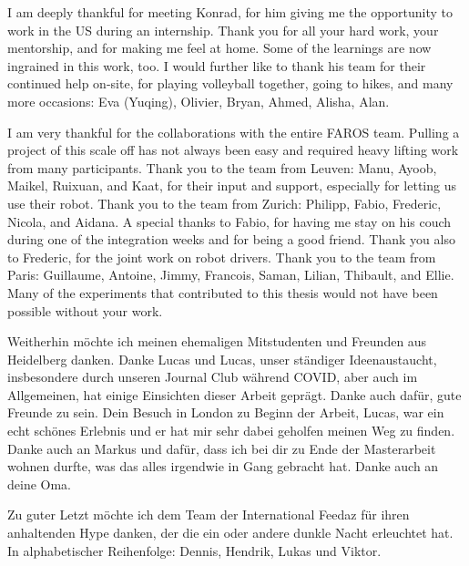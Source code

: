 


I am deeply thankful for meeting Konrad, for him giving me the opportunity to work in the US during an internship. Thank you for all your hard work, your mentorship, and for making me feel at home. Some of the learnings are now ingrained in this work, too. I would further like to thank his team for their continued help on-site, for playing volleyball together, going to hikes, and many more occasions: Eva (Yuqing), Olivier, Bryan, Ahmed, Alisha, Alan.


I am very thankful for the collaborations with the entire FAROS team. Pulling a project of this scale off has not always been easy and required heavy lifting work from many participants. Thank you to the team from Leuven: Manu, Ayoob, Maikel, Ruixuan, and Kaat, for their input and support, especially for letting us use their robot. Thank you to the team from Zurich: Philipp, Fabio, Frederic, Nicola, and Aidana. A special thanks to Fabio, for having me stay on his couch during one of the integration weeks and for being a good friend. Thank you also to Frederic, for the joint work on robot drivers. Thank you to the team from Paris: Guillaume, Antoine, Jimmy, Francois, Saman, Lilian, Thibault, and Ellie. Many of the experiments that contributed to this thesis would not have been possible without your work.

Weitherhin möchte ich meinen ehemaligen Mitstudenten und Freunden aus Heidelberg danken. Danke Lucas und Lucas, unser ständiger Ideenaustaucht, insbesondere durch unseren Journal Club während COVID, aber auch im Allgemeinen, hat einige Einsichten dieser Arbeit geprägt. Danke auch dafür, gute Freunde zu sein. Dein Besuch in London zu Beginn der Arbeit, Lucas, war ein echt schönes Erlebnis und er hat mir sehr dabei geholfen meinen Weg zu finden. Danke auch an Markus und dafür, dass ich bei dir zu Ende der Masterarbeit wohnen durfte, was das alles irgendwie in Gang gebracht hat. Danke auch an deine Oma.

Zu guter Letzt möchte ich dem Team der International Feedaz für ihren anhaltenden Hype danken, der die ein oder andere dunkle Nacht erleuchtet hat. In alphabetischer Reihenfolge: Dennis, Hendrik, Lukas und Viktor.
